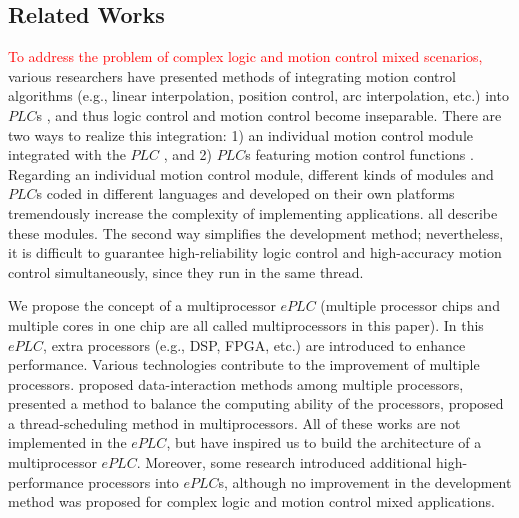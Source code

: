 \documentclass[journal,UTF8]{IEEEtran}
\begin{document}
	\subsection{Related Works}
	\textcolor{red}{To address the problem of complex logic and motion control mixed scenarios,} various researchers have presented methods of integrating motion control algorithms (e.g., linear interpolation, position control, arc interpolation, etc.) into $PLC$s \cite{Shi2016The,Fang2017Design},  and thus logic control and motion control become inseparable. There are two ways to realize this integration: 1) an individual motion control module integrated with the $PLC$ \cite{Peng2011Linear}, and 2) $PLC$s featuring motion control functions \textcolor{red}{\cite{syaichu2011model,kapernick2014plc,ruting2016model}}. Regarding an individual motion control module, different kinds of modules and $PLC$s coded in different languages and developed on their own platforms tremendously increase the complexity of implementing applications. \cite{Peng2011Linear,Qian2014A,Panasonic2011Programmable} all describe these modules. The second way simplifies the development method; nevertheless, it is difficult to guarantee high-reliability logic control and high-accuracy motion control simultaneously, since they run in the same thread. 
	
	We propose the concept of a multiprocessor $ePLC$ (multiple processor chips and multiple cores in one chip are all called multiprocessors in this paper). In this $ePLC$, extra processors (e.g., DSP, FPGA, etc.) are introduced to enhance performance. Various technologies contribute to the improvement of multiple processors. \cite{Dubois2002Memory,Patel2006Processor} proposed data-interaction methods among multiple processors, \cite{Zhu2016Providing} presented a method to balance the computing ability of the processors, \cite{Albarakat2017MTB} proposed a thread-scheduling method in multiprocessors. All of these works are not implemented in the $ePLC$, but have inspired us to build the architecture of a multiprocessor $ePLC$. Moreover, some research \cite{Hajduk2015Architecture, Chmiel2016An} introduced additional high-performance processors into $ePLC$s, although no improvement in the development method was proposed for complex logic and motion control mixed applications.
	
\end{document}
